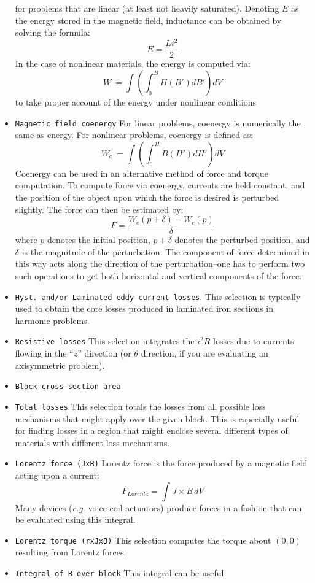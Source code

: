 \documentclass[12pt]{report}
\newcommand{\be}{\begin{equation}}
\newcommand{\ee}{\end{equation}}
\begin{document}
\begin{itemize}
for problems that are linear (at least not heavily saturated).
Denoting $E$ as the energy stored in the magnetic field, inductance
can be obtained by solving the formula:
\be E = \frac{L i^2}{2} \ee
In the case of nonlinear materials, the energy is computed via:
\be W \ = \int \left( \int_0^B H(B') dB' \right) dV \ee
to take proper account of the energy under nonlinear conditions
\item{\tt Magnetic field coenergy} For linear problems, coenergy
is numerically the same as energy.  For nonlinear problems,
coenergy is defined as:
\be W_c \ = \int \left( \int_0^H B(H') dH' \right) dV \ee
Coenergy can be used in an alternative method of force and torque
computation. To compute force via coenergy, currents are held
constant, and the position of the object upon which the force is
desired is perturbed slightly. The force can then be estimated by:
\be \label{coenergyforce} F=\frac{W_c(p+\delta) - W_c(p)}{\delta} \ee
where $p$ denotes the initial position, $p+\delta$ denotes the
perturbed position, and $\delta$ is the magnitude of the
perturbation.  The component of force determined in this way acts
along the direction of the perturbation--one has to perform two
such operations to get both horizontal and vertical components of
the force.
\item {\tt Hyst. and/or Laminated eddy current losses}.  This
selection is typically used to obtain the core losses produced in
laminated iron sections in harmonic problems.
\item {\tt Resistive losses}  This selection integrates the $i^2R$
losses due to currents flowing in the ``$z$'' direction (or
$\theta$ direction, if you are evaluating an axisymmetric problem).
\item {\tt Block cross-section area}
\item {\tt Total losses} This selection totals the losses from all
possible loss mechanisms that might apply over the given block.
This is especially useful for finding losses in a region that might
enclose several different types of materials with different loss
mechanisms.
\item {\tt Lorentz force (JxB)}  Lorentz force is the force
produced by a magnetic field acting upon a current:
\be F_{Lorentz}=\int J \times B \, dV \ee Many
devices ({\em e.g.} voice coil actuators) produce forces in a
fashion that can be evaluated using this integral.
\item {\tt Lorentz torque (rxJxB)}  This selection computes the
torque about $(0,0)$ resulting from Lorentz forces.
\item {\tt Integral of B over block}  This integral can be useful

\end{itemize}
\end{document}
